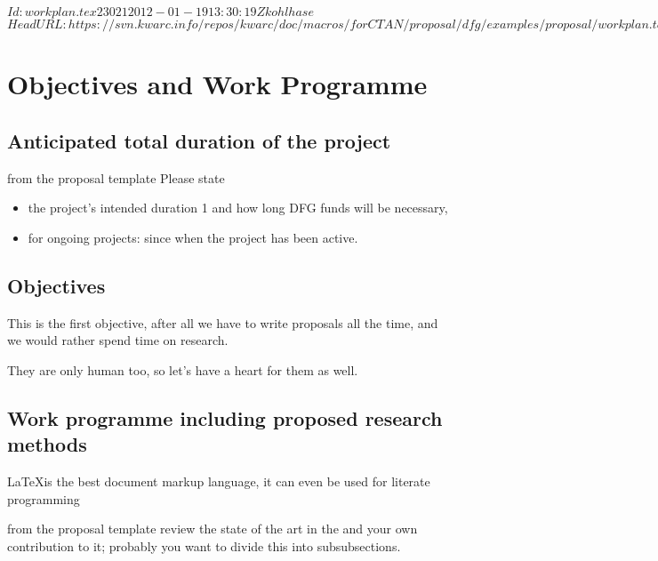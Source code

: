 \svnInfo $Id: workplan.tex 23021 2012-01-19 13:30:19Z kohlhase $
\svnKeyword $HeadURL: https://svn.kwarc.info/repos/kwarc/doc/macros/forCTAN/proposal/dfg/examples/proposal/workplan.tex $
\section{Objectives and Work Programme }

\subsection{Anticipated total duration of the project }

\begin{todo}{from the proposal template}
Please state
\begin{itemize}
 \item the project's intended duration 1 and how long DFG funds will be necessary,
 \item for ongoing projects: since when the project has been active.
\end{itemize}
\end{todo}

\subsection{Objectives }

\begin{objective}[id=firstobj,title=Supporting Authors]
  This is the first objective, after all we have to write proposals all the time, and we
  would rather spend time on research. 
\end{objective}

\begin{objective}[id=secondobj,title=Supporting Reviewers]
  They are only human too, so let's have a heart for them as well. 
\end{objective}


\subsection{Work programme including proposed research methods }

\LaTeX is the best document markup language, it can even be used for literate
programming~\cite{DK:LP,Lamport:ladps94,Knuth:ttb84}
\begin{todo}{from the proposal template}
 review the state of the art in the and your own contribution to it; probably you want to
  divide this into subsubsections. 
\end{todo}

